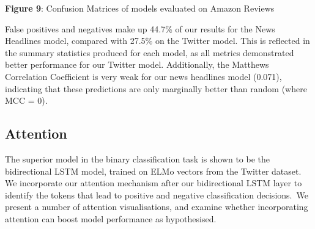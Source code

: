 \documentclass[12pt,a4paper]{article}
\begin{document}
\begin{center}
	\textbf{Figure 9}: Confusion Matrices of models evaluated on Amazon Reviews\vspace{-8pt}
\end{center}

\noindent False positives and negatives make up 44.7\% of our results for the News Headlines model, compared with 27.5\% on the Twitter model. This is reflected in the summary statistics produced for each model, as all metrics demonstrated better performance for our Twitter model. Additionally, the Matthews Correlation Coefficient is very weak for our news headlines model (0.071), indicating that these predictions are only marginally better than random (where MCC = 0).

\subsection{Attention}\vspace{-5pt}
\noindent The superior model in the binary classification task is shown to be the bidirectional LSTM model, trained on ELMo vectors from the Twitter dataset. We incorporate our attention mechanism after our bidirectional LSTM layer to identify the tokens that lead to positive and negative classification decisions.\ We present a number of attention visualisations, and examine whether incorporating attention can boost model performance as hypothesised.\\\vspace{-5pt}
\end{document}
